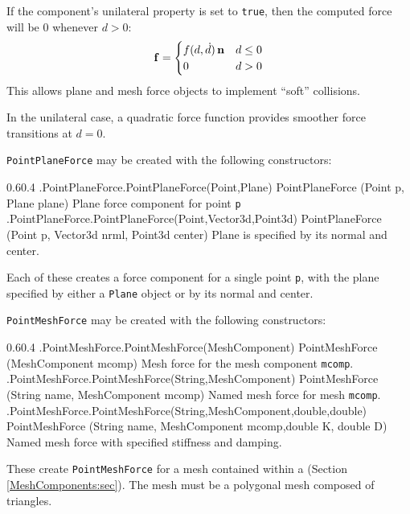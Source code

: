 If the component's {\sf unilateral} property is set to {\tt true}, then the
computed force will be 0 whenever $d > 0$:
%
\begin{equation*}
{\bf f} = 
\begin{cases}
f (d, \dot d) \, {\bf n} & d \le 0 \\
0 & d > 0
\end{cases}
\end{equation*}
%
This allows plane and mesh force objects to implement ``soft'' collisions.

\begin{sideblock}
In the unilateral case, a quadratic force function provides smoother force
transitions at $d = 0$.
\end{sideblock}

{\tt PointPlaneForce} may be created with the following constructors:
%
\begin{methodtable}{0.6}{0.4}
\midline
%
\methodentry
{\mech.PointPlaneForce.PointPlaneForce(Point,Plane)}%
{PointPlaneForce (Point p, Plane plane)}%
{Plane force component for point {\tt p}}%
%
\methodentry
{\mech.PointPlaneForce.PointPlaneForce(Point,Vector3d,Point3d)}%
{PointPlaneForce (Point p, Vector3d nrml, Point3d center)}%
{Plane is specified by its normal and center.}%
%
\midline
\end{methodtable}
%
Each of these creates a force component for a single point {\tt p}, with the
plane specified by either a {\tt Plane} object or by its normal and center.

{\tt PointMeshForce} may be created with the following constructors:
%
\begin{methodtable}{0.6}{0.4}
\midline
%
\methodentry
{\mech.PointMeshForce.PointMeshForce(MeshComponent)}%
{PointMeshForce (MeshComponent mcomp)}%
{Mesh force for the mesh component {\tt mcomp}.}%
%
\methodentry
{\mech.PointMeshForce.PointMeshForce(String,MeshComponent)}%
{PointMeshForce (String name, MeshComponent mcomp)}%
{Named mesh force for mesh {\tt mcomp}.}%
%
\methodentry
{\mech.PointMeshForce.PointMeshForce(String,MeshComponent,double,double)}%
{PointMeshForce (String name, MeshComponent mcomp,\brh double K, double D)}%
{Named mesh force with specified stiffness and damping.}%
%
\midline
\end{methodtable}
%
These create {\tt PointMeshForce} for a mesh contained within a
 (Section \ref{MeshComponents:sec}).
The mesh must be a polygonal mesh composed of triangles.

